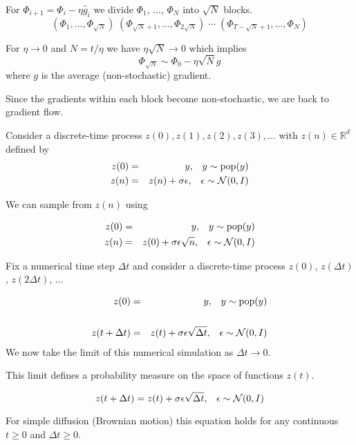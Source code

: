 {
For $\Phi_{i+1} = \Phi_i - \eta \hat{g}_i$ we divide $\Phi_1$, $\ldots$, $\Phi_N$ into $\sqrt{N}$ blocks.
$$(\Phi_1,\dots,\Phi_{\sqrt{N}})\;(\Phi_{\sqrt{N}+1},\ldots,\Phi_{2\sqrt{N}})\;\cdots\;(\Phi_{T-\sqrt{N}+1},\ldots,\Phi_N)$$

\vfill
For $\eta \rightarrow 0$ and $N = t/\eta$ we have $\eta\sqrt{N} \rightarrow 0$ which implies
$$\Phi_{\sqrt{N}} \sim \Phi_0 - \eta\sqrt{N} g$$
where $g$ is the average (non-stochastic)
gradient.

\vfill
Since the gradients within each block become non-stochastic, we are back to gradient flow.


Consider a discrete-time process $z(0),z(1),z(2),z(3),\ldots$ with $z(n)\in \mathbb{R}^d$ defined by
\begin{eqnarray*}
  z(0) & = & y,\;\;\;y \sim \mathrm{pop}(y) \\
  z(n) & = & z(n) + \sigma\epsilon,\;\;\;\epsilon \sim {\cal N}(0,I)
\end{eqnarray*}

\vfill
We can sample from $z(n)$ using

\begin{eqnarray*}
  z(0) & = & y,\;\;\;y \sim \mathrm{pop}(y) \\
  z(n) & = & z(0) + \sigma\epsilon\sqrt{n} ,\;\;\;\epsilon \sim {\cal N}(0,I)
\end{eqnarray*}

Fix a numerical time step $\Delta t$ and consider a discrete-time process $z(0)$, $z(\Delta t)$, $z(2\Delta t)$, $\ldots$

{\huge
\begin{eqnarray*}
  z(0) & = & y,\;\;\;y \sim \mathrm{pop}(y) \\
  \\
  z(t+\Delta t) & = & z(t) + \sigma\epsilon\sqrt{\Delta t},\;\;\;\epsilon\sim {\cal N}(0,I) \\
\end{eqnarray*}
}
We now take the limit of this numerical simulation as $\Delta t \rightarrow 0$.

\vfill
This limit defines a probability measure on the space of functions $z(t)$.


$$z(t+\Delta t) =  z(t) + \sigma\epsilon\sqrt{\Delta t},\;\;\;\epsilon \sim {\cal N}(0,I)$$

\vfill
For simple diffusion (Brownian motion) this equation holds for any continuous $t \geq 0$
and $\Delta t \geq 0$.

}
